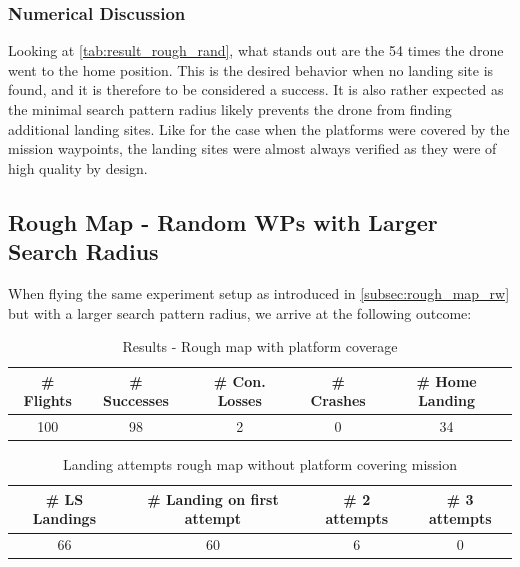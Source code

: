     \subsubsection{Numerical Discussion}

    Looking at \cref{tab:result_rough_rand}, what stands out are the 54 times the drone went to the home position. This is the desired behavior when no landing site is found, and it is therefore to be considered a success. It is also rather expected as the minimal search pattern radius likely prevents the drone from finding additional landing sites. Like for the case when the platforms were covered by the mission waypoints, the landing sites were almost always verified as they were of high quality by design. 
    

\subsection{Rough Map - Random WPs with Larger Search Radius}

    When flying the same experiment setup as introduced in \cref{subsec:rough_map_rw} but with a larger search pattern radius, we arrive at the following outcome:

    \begin{table}[h]
        \begin{center}
         \caption{Results - Rough map with platform coverage}\vspace{1ex}
         \label{tab:result_rough_rand_lr}
         \begin{tabular}{|c|c|c|c|c|}
         \hline
         \# Flights & \# Successes & \# Con. Losses & \# Crashes & \# Home Landing\\ \hline \hline
         100 & 98 & 2 & 0 & 34 \\
         \hline
         \end{tabular}
        \end{center}
    \end{table}

    \begin{table}[h]
        \begin{center}
         \caption{Landing attempts rough map without platform covering mission}\vspace{1ex}
         \label{tab:land_nums_rough_rand_lr}
         \begin{tabular}{|c|c|c|c|}
         \hline
         \# LS Landings & \# Landing on first attempt & \# 2 attempts & \# 3 attempts\\ \hline \hline
         66 & 60 & 6 & 0 \\
         \hline
         \end{tabular}
        \end{center}
    \end{table}

